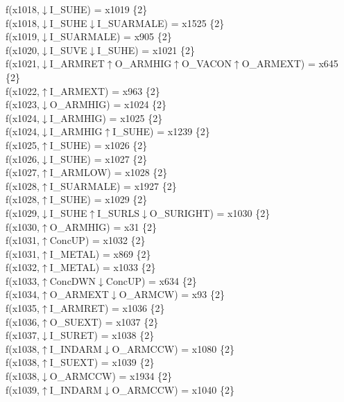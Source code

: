 f(x1018,$\downarrow$I\_SUHE) = x1019 \{2\} \\  
f(x1018,$\downarrow$I\_SUHE$\downarrow$I\_SUARMALE) = x1525 \{2\} \\  
f(x1019,$\downarrow$I\_SUARMALE) = x905 \{2\} \\  
f(x1020,$\downarrow$I\_SUVE$\downarrow$I\_SUHE) = x1021 \{2\} \\  
f(x1021,$\downarrow$I\_ARMRET$\uparrow$O\_ARMHIG$\uparrow$O\_VACON$\uparrow$O\_ARMEXT) = x645 \{2\} \\  
f(x1022,$\uparrow$I\_ARMEXT) = x963 \{2\} \\  
f(x1023,$\downarrow$O\_ARMHIG) = x1024 \{2\} \\  
f(x1024,$\downarrow$I\_ARMHIG) = x1025 \{2\} \\  
f(x1024,$\downarrow$I\_ARMHIG$\uparrow$I\_SUHE) = x1239 \{2\} \\  
f(x1025,$\uparrow$I\_SUHE) = x1026 \{2\} \\  
f(x1026,$\downarrow$I\_SUHE) = x1027 \{2\} \\  
f(x1027,$\uparrow$I\_ARMLOW) = x1028 \{2\} \\  
f(x1028,$\uparrow$I\_SUARMALE) = x1927 \{2\} \\  
f(x1028,$\uparrow$I\_SUHE) = x1029 \{2\} \\  
f(x1029,$\downarrow$I\_SUHE$\uparrow$I\_SURLS$\downarrow$O\_SURIGHT) = x1030 \{2\} \\  
f(x1030,$\uparrow$O\_ARMHIG) = x31 \{2\} \\  
f(x1031,$\uparrow$ConcUP) = x1032 \{2\} \\  
f(x1031,$\uparrow$I\_METAL) = x869 \{2\} \\  
f(x1032,$\uparrow$I\_METAL) = x1033 \{2\} \\  
f(x1033,$\uparrow$ConcDWN$\downarrow$ConcUP) = x634 \{2\} \\  
f(x1034,$\uparrow$O\_ARMEXT$\downarrow$O\_ARMCW) = x93 \{2\} \\  
f(x1035,$\uparrow$I\_ARMRET) = x1036 \{2\} \\  
f(x1036,$\uparrow$O\_SUEXT) = x1037 \{2\} \\  
f(x1037,$\downarrow$I\_SURET) = x1038 \{2\} \\  
f(x1038,$\uparrow$I\_INDARM$\downarrow$O\_ARMCCW) = x1080 \{2\} \\  
f(x1038,$\uparrow$I\_SUEXT) = x1039 \{2\} \\  
f(x1038,$\downarrow$O\_ARMCCW) = x1934 \{2\} \\  
f(x1039,$\uparrow$I\_INDARM$\downarrow$O\_ARMCCW) = x1040 \{2\} \\  

